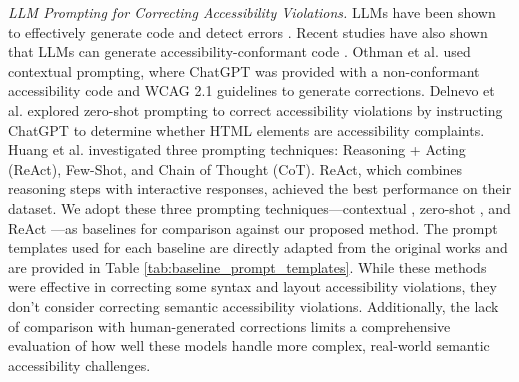 \documentclass[sigconf, nonacm]{acmart}
\begin{document}
\emph{LLM Prompting for Correcting  Accessibility Violations.} \label{relatedWork} LLMs have been shown to effectively generate code and detect errors \cite{DBLP:conf/icse/NamMHVM24, DBLP:conf/nips/LiuXW023, DBLP:conf/chi/Vaithilingam0G22, DBLP:conf/w4a/AljedaaniHAEF24, DBLP:journals/corr/abs-2107-03374, DBLP:journals/corr/abs-2108-07732, DBLP:conf/naacl/AhmadCRC21}. Recent studies have also shown that LLMs can generate accessibility-conformant code \cite{DBLP:conf/w4a/AljedaaniHAEF24, iyad2024}. Othman et al. \cite{DBLP:conf/petra/OthmanDJ23} used contextual prompting, where ChatGPT was provided with a non-conformant accessibility code and WCAG 2.1 guidelines to generate corrections. Delnevo et al. \cite{DBLP:conf/ccnc/DelnevoAM24} explored zero-shot prompting to correct accessibility violations by instructing ChatGPT to determine whether HTML elements are accessibility complaints. Huang et al. \cite{DBLP:journals/corr/abs-2401-16450} investigated three prompting techniques: Reasoning + Acting (ReAct), Few-Shot, and Chain of Thought (CoT).  ReAct, which combines reasoning steps with interactive responses, achieved the best performance on their dataset.
We adopt these three prompting techniques—contextual \cite{DBLP:conf/petra/OthmanDJ23}, zero-shot \cite{DBLP:conf/ccnc/DelnevoAM24}, and ReAct \cite{DBLP:journals/corr/abs-2401-16450}—as baselines for comparison against our proposed method. The prompt templates used for each baseline are directly adapted from the original works and are provided in Table \ref{tab:baseline_prompt_templates}. While these methods were effective in correcting some syntax and layout accessibility violations, they don't consider correcting semantic accessibility violations. Additionally, the lack of comparison with human-generated corrections limits a comprehensive evaluation of how well these models handle more complex, real-world semantic accessibility challenges.
\end{document}
